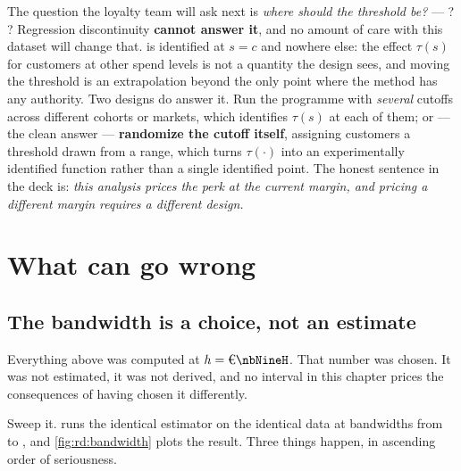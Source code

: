 \begin{remark}
The question the loyalty team will ask next is \emph{where should the threshold be?} ---
? ? Regression discontinuity \textbf{cannot answer it}, and no amount of care with
this dataset will change that.  is identified at $s = c$ and nowhere else: the
effect $\tau(s)$ for customers at other spend levels is not a quantity the design sees, and moving
the threshold is an extrapolation beyond the only point where the method has any authority. Two
designs do answer it. Run the programme with \emph{several} cutoffs across different cohorts or
markets, which identifies $\tau(s)$ at each of them; or --- the clean answer --- \textbf{randomize
the cutoff itself}, assigning customers a threshold drawn from a range, which turns $\tau(\cdot)$
into an experimentally identified function rather than a single identified point. The honest sentence
in the deck is: \emph{this analysis prices the perk at the current margin, and pricing a different
margin requires a different design.}
\end{remark}

\section{What can go wrong}
\label{sec:rd:wrong}

\subsection*{The bandwidth is a choice, not an estimate}

Everything above was computed at $h = \eur{\nbNineH}$. That number was chosen. It was not estimated,
it was not derived, and no interval in this chapter prices the consequences of having chosen it
differently.

Sweep it.  runs the identical estimator on the identical data at
\nbNineBwNWindows{} bandwidths from \eur{\nbNineBwMin} to \eur{\nbNineBwMax}, and
\cref{fig:rd:bandwidth} plots the result. Three things happen, in ascending order of seriousness.




